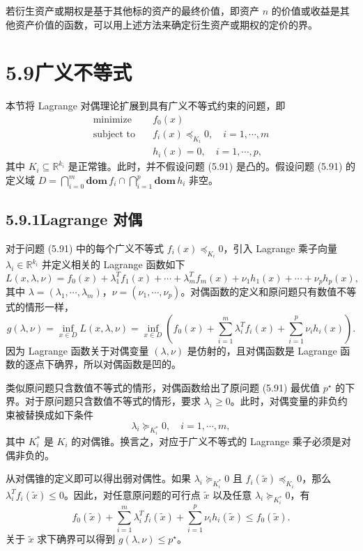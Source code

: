 \documentclass[UTF8, 12pt, fontset=fandol, oneside]{ctexart}
\begin{document}
若衍生资产或期权是基于其他标的资产的最终价值，即资产 $n$ 的价值或收益是其他资产价值的函数，可以用上述方法来确定衍生资产或期权的定价的界。

\section*{5.9\quad 广义不等式}

本节将 Lagrange 对偶理论扩展到具有广义不等式约束的问题，即
\begin{equation}
\begin{aligned}
\text{minimize}\quad & f_0(x)\\
\text{subject to}\quad & f_i(x)\preceq_{K_i}0,\quad i=1,\cdots,m\\
& h_i(x)=0,\quad i=1,\cdots,p,
\end{aligned}
\tag{5.91}
\end{equation}
其中 $K_i\subseteq\mathbb{R}^{k_i}$ 是正常锥。此时，并不假设问题 (5.91) 是凸的。假设问题 (5.91) 的定义域 $D=\bigcap_{i=0}^m\mathbf{dom}\,f_i\cap\bigcap_{i=1}^p\mathbf{dom}\,h_i$ 非空。

\subsection*{5.9.1\quad Lagrange 对偶}

对于问题 (5.91) 中的每个广义不等式 $f_i(x)\preceq_{K_i}0$，引入 Lagrange 乘子向量 $\lambda_i\in\mathbb{R}^{k_i}$ 并定义相关的 Lagrange 函数如下
\[
L(x,\lambda,\nu)=f_0(x)+\lambda_1^Tf_1(x)+\cdots+\lambda_m^Tf_m(x)+\nu_1h_1(x)+\cdots+\nu_ph_p(x),
\]
其中 $\lambda=(\lambda_1,\cdots,\lambda_m)$，$\nu=(\nu_1,\cdots,\nu_p)$。对偶函数的定义和原问题只有数值不等式的情形一样，
\[
g(\lambda,\nu)=\inf_{x\in D}L(x,\lambda,\nu)
=\inf_{x\in D}\left(f_0(x)+\sum_{i=1}^m\lambda_i^Tf_i(x)+\sum_{i=1}^p\nu_i h_i(x)\right).
\]
因为 Lagrange 函数关于对偶变量 $(\lambda,\nu)$ 是仿射的，且对偶函数是 Lagrange 函数的逐点下确界，所以对偶函数是凹的。

类似原问题只含数值不等式的情形，对偶函数给出了原问题 (5.91) 最优值 $p^\star$ 的下界。对于原问题只含数值不等式的情形，要求 $\lambda_i\geq 0$。此时，对偶变量的非负约束被替换成如下条件
\[
\lambda_i\succeq_{K_i^\ast}0,\quad i=1,\cdots,m,
\]
其中 $K_i^\ast$ 是 $K_i$ 的对偶锥。换言之，对应于广义不等式的 Lagrange 乘子必须是对偶非负的。

从对偶锥的定义即可以得出弱对偶性。如果 $\lambda_i\succeq_{K_i^\ast}0$ 且 $f_i(\tilde{x})\preceq_{K_i}0$，那么 $\lambda_i^Tf_i(\tilde{x})\leq 0$。因此，对任意原问题的可行点 $\tilde{x}$ 以及任意 $\lambda_i\succeq_{K_i^\ast}0$，有
\[
f_0(\tilde{x})+\sum_{i=1}^m\lambda_i^Tf_i(\tilde{x})+\sum_{i=1}^p\nu_i h_i(\tilde{x})\leq f_0(\tilde{x}).
\]
关于 $\tilde{x}$ 求下确界可以得到 $g(\lambda,\nu)\leq p^\star$。
\end{document}
